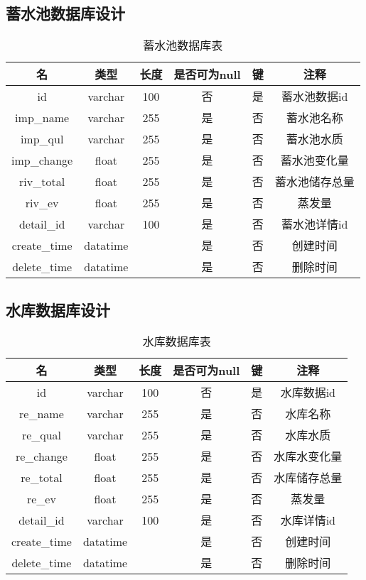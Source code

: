 \subsection{蓄水池数据库设计}

\begin{table}[H]
	\centering
	\caption[蓄水池数据]{蓄水池数据库表}
	\begin{tabular}{cccccc}
		\toprule
		名            & 类型      & 长度 &是否可为null & 键 & 注释\\
		\midrule
		id            & varchar  & 100  & 否 & 是 & 蓄水池数据id \\
		imp\_name     & varchar  & 255  &是  & 否 & 蓄水池名称   \\
		imp\_qul      & varchar  & 255  &是  & 否 & 蓄水池水质   \\
		imp\_change   & float    & 255  &是  & 否 & 蓄水池变化量 \\
		riv\_total    & float    & 255  &是  & 否 & 蓄水池储存总量   \\
		riv\_ev       & float    & 255  & 是 & 否 & 蒸发量     \\
		detail\_id    & varchar  & 100  & 是 & 否 & 蓄水池详情id \\
		create\_time  & datatime &      &是  & 否 & 创建时间   \\
		delete\_time  &datatime  &      & 是 & 否 & 删除时间   \\ 
		\bottomrule
	\end{tabular}
\end{table}
\subsection{水库数据库设计}
\begin{table}[H]
	\centering
	\caption[水库数据]{水库数据库表}
	\begin{tabular}{cccccc}
		\toprule
		名            & 类型      & 长度 &是否可为null & 键 & 注释\\
		\midrule
		id            & varchar  & 100  & 否 & 是 & 水库数据id \\
		re\_name      & varchar  & 255  &是  & 否 & 水库名称   \\
		re\_qual      & varchar  & 255  &是  & 否 & 水库水质   \\
		re\_change    & float    & 255  &是  & 否 & 水库水变化量 \\
		re\_total     & float    & 255  &是  & 否 & 水库储存总量   \\
		re\_ev        & float    & 255  & 是 & 否 & 蒸发量     \\
		detail\_id    & varchar  & 100  & 是 & 否 & 水库详情id \\
		create\_time  & datatime &      &是  & 否 & 创建时间   \\
		delete\_time  &datatime  &      & 是 & 否 & 删除时间   \\ 
		\bottomrule
	\end{tabular}
\end{table}
